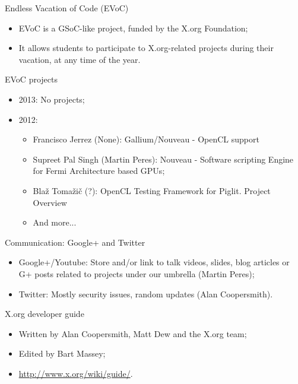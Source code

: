 \documentclass{beamer}
\begin{document}
		\begin{frame}
			\begin{block}{Endless Vacation of Code (EVoC)}
				\begin{itemize}
					\item EVoC is a GSoC-like project, funded by the X.org Foundation;
					\item It allows students to participate to
X.org-related projects during their vacation, at any time of the year.
				\end{itemize}
			\end{block}

			\begin{block}{EVoC projects}
				\begin{itemize}
					\item 2013: No projects;
					\item 2012:
					\begin{itemize}
						\item Francisco Jerrez (None): Gallium/Nouveau - OpenCL support
						\item Supreet Pal Singh (Martin Peres): Nouveau - Software scripting Engine for Fermi Architecture based GPUs;
						\item Blaž Tomažič (?): OpenCL Testing Framework for Piglit. Project Overview 
						\item And more...
					\end{itemize}
				\end{itemize}
			\end{block}
		\end{frame}

		\begin{frame}
			\begin{block}{Communication: Google+ and Twitter}
				\begin{itemize}
					\item Google+/Youtube: Store and/or link
to talk videos, slides, blog articles or G+ posts related to projects under our umbrella (Martin Peres);
					\item Twitter: Mostly security issues, random updates (Alan Coopersmith).
				\end{itemize}
			\end{block}

			\begin{block}{X.org developer guide}
				\begin{itemize}
					\item Written by Alan Coopersmith, Matt Dew and the X.org team;
					\item Edited by Bart Massey;
					\item \url{http://www.x.org/wiki/guide/}.
				\end{itemize}
			\end{block}
		\end{frame}
\end{document}
